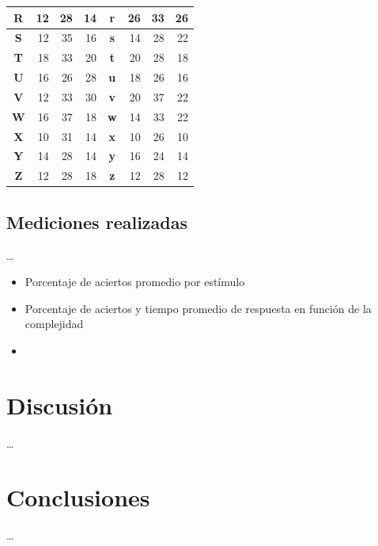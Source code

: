 \documentclass[runningheads,a4paper]{llncs}
\begin{document}
\begin{table}
\begin{tabular}{c|r|r|r|c|r|r|r}
\textbf{R}   & 12   &   28   &   14   &   \textbf{r}   & 26   &   33   &   26   \\\hline
\textbf{S}   & 12   &   35   &   16   &   \textbf{s}   & 14   &   28   &   22   \\\hline
\textbf{T}   & 18   &   33   &   20   &   \textbf{t}   & 20   &   28   &   18   \\\hline
\textbf{U}   & 16   &   26   &   28   &   \textbf{u}   & 18   &   26   &   16   \\\hline
\textbf{V}   & 12   &   33   &   30   &   \textbf{v}   & 20   &   37   &   22   \\\hline
\textbf{W}   & 16   &   37   &   18   &   \textbf{w}   & 14   &   33   &   22   \\\hline
\textbf{X}   & 10   &   31   &   14   &   \textbf{x}   & 10   &   26   &   10   \\\hline
\textbf{Y}   & 14   &   28   &   14   &   \textbf{y}   & 16   &   24   &   14   \\\hline
\textbf{Z}   & 12   &   28   &   18   &   \textbf{z}   & 12   &   28   &   12   \\\hline
\end{tabular}
\end{table}

\subsection{Mediciones realizadas}
\ldots
\begin{itemize}
 \item Porcentaje de aciertos promedio por estímulo
 \item Porcentaje de aciertos y tiempo promedio de respuesta en función de la complejidad
 \item 

\end{itemize}


\section{Discusi\'on}
\ldots

\section{Conclusiones}
\ldots


\newpage
\end{document}
